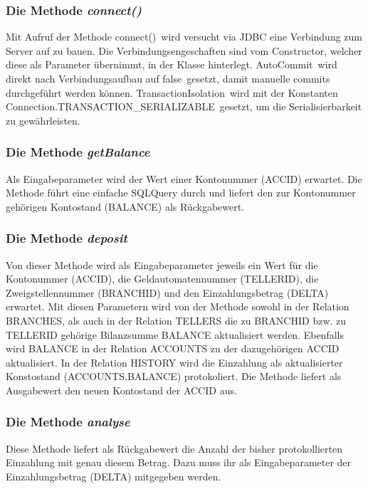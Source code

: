 \documentclass[a4paper, bibliography=totoc, 12pt]{scrartcl}
\begin{document}
		\subsubsection{Die Methode \emph{connect()}}
 		Mit Aufruf der Methode \glqq connect()\grqq\ wird versucht via JDBC eine Verbindung zum Server auf zu bauen. Die Verbindungsengeschaften sind vom Constructor, welcher diese als Parameter übernimmt, in der Klasse hinterlegt.
		\glqq AutoCommit\grqq\ wird direkt nach Verbindungsaufbau auf \glqq false\grqq\ gesetzt, damit manuelle commits durchgeführt werden können.
		\glqq TransactionIsolation\grqq\ wird mit der Konstanten \glqq Connection.TRANSACTION\_SERIALIZABLE\grqq\ gesetzt, um die Serialisierbarkeit zu gewährleisten.

		\subsubsection{Die Methode \emph{getBalance}}
		Als Eingabeparameter wird der Wert einer Kontonummer (ACCID) erwartet. Die Methode führt eine einfache SQLQuery durch und liefert den zur Kontonummer gehörigen Kontostand (BALANCE) als Rückgabewert.

		\subsubsection{Die Methode \emph{deposit}}
		Von dieser Methode wird als Eingabeparameter jeweils ein Wert für die Kontonummer (ACCID), die Geldautomatennummer (TELLERID), die Zweigstellennummer (BRANCHID) und den Einzahlungsbetrag (DELTA) erwartet.
		Mit diesen Parametern wird von der Methode sowohl in der Relation BRANCHES, als auch in der Relation TELLERS die zu BRANCHID bzw. zu TELLERID gehörige Bilanzsumme BALANCE aktualisiert werden. Ebenfalls wird BALANCE in der Relation ACCOUNTS zu der dazugehörigen ACCID aktualisiert.
		In der Relation HISTORY wird die Einzahlung als aktualisierter Konstostand (ACCOUNTS.BALANCE) protokoliert.
		Die Methode liefert als Ausgabewert den neuen Kontostand der ACCID aus.
		
		\subsubsection{Die Methode \emph{analyse}}
		Diese Methode liefert als Rückgabewert die Anzahl der bisher protokollierten Einzahlung mit genau diesem Betrag.
		Dazu muss ihr als Eingabeparameter der Einzahlungsbetrag (DELTA) mitgegeben werden.
\end{document}
